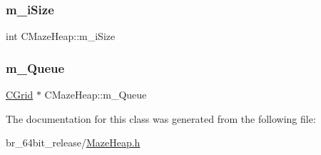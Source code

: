 \subsubsection{\texorpdfstring{m\_iSize}{m\_iSize}}
{\footnotesize\ttfamily int C\+Maze\+Heap\+::m\+\_\+i\+Size}

\mbox{\label{classCMazeHeap_a40d9fd82776322cab3be140b8ff15bba}} 
\subsubsection{\texorpdfstring{m\_Queue}{m\_Queue}}
{\footnotesize\ttfamily \mbox{\hyperlink{classCGrid}{C\+Grid}} $\ast$ C\+Maze\+Heap\+::m\+\_\+\+Queue\hspace{0.3cm}{\ttfamily [static]}}



The documentation for this class was generated from the following file\+:\begin{DoxyCompactItemize}
\item 
br\+\_\+64bit\+\_\+release/\mbox{\hyperlink{MazeHeap_8h}{Maze\+Heap.\+h}}\end{DoxyCompactItemize}
